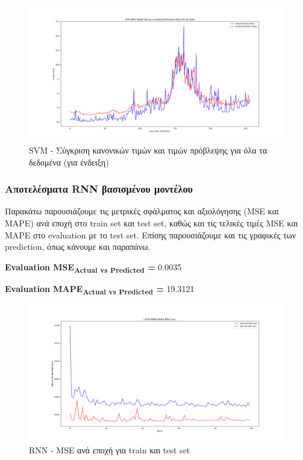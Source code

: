 \documentclass[12pt,a4paper]{article}
\begin{document}
\begin{figure}[H]
	\includegraphics[width=\textwidth]{Figures/Question3/2. SVR Actual vs Predicted All Data.png}
	\caption{SVM - Σύγκριση κανονικών τιμών και τιμών πρόβλεψης για όλα τα δεδομένα (για ένδειξη)}
\end{figure}

\subsubsection{Αποτελέσματα RNN βασισμένου μοντέλου}

Παρακάτω παρουσιάζουμε τις μετρικές σφάλματος και αξιολόγησης (MSE και MAPE) ανά εποχή στο train set και test set, καθώς και τις τελικές τιμές MSE και MAPE στο evaluation με το test set. Επίσης παρουσιάζουμε και τις γραφικές των prediction, όπως κάνουμε και παραπάνω.

\textbf{Evaluation MSE\textsubscript{Actual vs Predicted} =} 0.0035

\textbf{Evaluation MAPE\textsubscript{Actual vs Predicted} =} 19.3121

\begin{figure}[H]
	\includegraphics[width=\textwidth]{Figures/Question3/3. RNN Model MSE Loss.png}
	\caption{RNN - MSE ανά εποχή για train και test set}
\end{figure}
\end{document}
